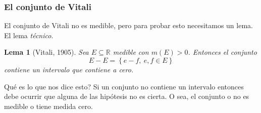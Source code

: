 \documentclass[12pt]{article}
\theoremstyle{plain}
\newtheorem{Lem}[Th]{Lema}             %
\theoremstyle{definition}
\theoremstyle{remark}
\numberwithin{equation}{section}
\newcommand{\bR}{\mathbb{R}}        %
\renewcommand{\:}{\colon}           %
\newcommand{\conj}[1]{\left\lbrace#1\right\rbrace}
\begin{document}
\begin{multicols}{2}
\subsubsection*{El conjunto de Vitali}

El conjunto de Vitali no es medible, pero para probar esto necesitamos un lema. El lema \textit{técnico}.

\begin{Lem}[Vitali, 1905]\label{lem:LemaTecVitali}
  Sea $E\subseteq\bR$ medible con $m(E)>0$. Entonces el conjunto
  $$E-E=\conj{e-f,\ e,f\in E}$$
  contiene un intervalo que contiene a cero.
\end{Lem}

Qué es lo que nos dice esto? Si un conjunto no contiene un intervalo entonces debe ocurrir que alguna de las hipótesis no es cierta. O sea, el conjunto o no es medible o tiene medida cero.


\end{multicols}
\end{document}
